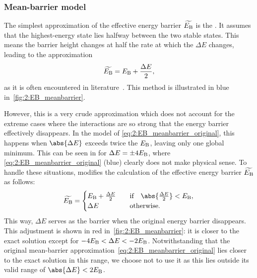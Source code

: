 \subsubsection{Mean-barrier model}
The simplest approximation of the effective energy barrier $\widetilde{E_\mathrm{B}}$ is the .
It assumes that the highest-energy state lies halfway between the two stable states.
This means the barrier height changes at half the rate at which the  $\Delta E$ changes, leading to the approximation
\begin{equation}
	\label{eq:2:EB_meanbarrier_original}
	\widetilde{E_\mathrm{B}} = E_\mathrm{B} + \frac{\Delta E}{2} \mathrm{,}
\end{equation}
as it is often encountered in literature~\cite{MC_TemperatureDesorption,DirectionalEnergyBarrier,HyperCubicThermalASI}.
This method is illustrated in blue in~\cref{fig:2:EB_meanbarrier}. \par
However, this is a very crude approximation which does not account for the extreme cases where the interactions are so strong that the energy barrier effectively disappears.
In the model of \cref{eq:2:EB_meanbarrier_original}, this happens when $\abs{\Delta E}$ exceeds twice the  $E_\mathrm{B}$, leaving only one global minimum.
This can be seen in  for $\Delta E = \pm 4 E_\mathrm{B}$, where \cref{eq:2:EB_meanbarrier_original} (blue) clearly does not make physical sense.
To handle these situations, \hotspice modifies the calculation of the effective energy barrier $\widetilde{E_\mathrm{B}}$ as follows:
\begin{equation}
	\label{eq:2:EB_meanbarrier_cases}
	\widetilde{E_\mathrm{B}} = \begin{cases}
		E_\mathrm{B} + \frac{\Delta E}{2} & \quad \text{if} \quad \abs{\frac{\Delta E}{2}} < E_\mathrm{B}, \\
		\Delta E & \quad \text{otherwise}.
	\end{cases}
\end{equation}
This way, $\Delta E$ serves as the barrier when the original energy barrier disappears.
This adjustment is shown in red in~\cref{fig:2:EB_meanbarrier}: it is closer to the exact solution except for $-4 E_\mathrm{B} < \Delta E < -2 E_\mathrm{B}$.
Notwithstanding that the original mean-barrier approximation~\eqref{eq:2:EB_meanbarrier_original} lies closer to the exact solution in this range, we choose not to use it as this lies outside its valid range of $\abs{\Delta E} < 2 \EB$.

